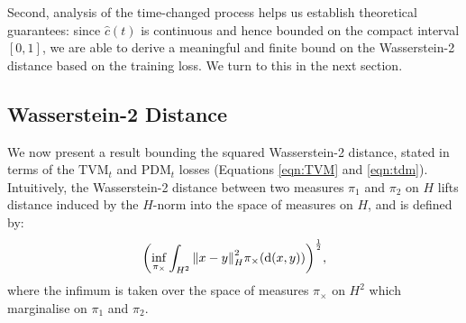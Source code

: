 Second, analysis of the time-changed process helps us establish theoretical guarantees: since \(\hat{c}(t)\) is continuous and hence bounded on the compact interval \([0, 1]\), we are able to derive a  meaningful and finite bound on the Wasserstein-2 distance based on the training loss. We turn to this in the next section.


\subsection{Wasserstein-2 Distance}
We now present a result bounding the squared Wasserstein-2 distance, stated in terms of the \(\mathrm{TVM}_{t}\) and \(\mathrm{PDM}_{t}\) losses (Equations \ref{eqn:TVM} and \ref{eqn:tdm}). Intuitively, the Wasserstein-2 distance between two measures \(\pi_{1}\) and \(\pi_{2}\) on \(H\) lifts distance induced by the \(H\)-norm into the space of measures on \(H\), and is defined by:
\[
  \qty(\inf_{\pi_{\times}} \int_{H^{2}} \norm{x - y}^{2}_{H} \pi_{\times}(\dd{(x, y)}))^{\frac{1}{2}},
\]
where the infimum is taken over the space of measures \(\pi_{\times}\) on \(H^{2}\) which marginalise on \(\pi_{1}\) and \(\pi_{2}\).

